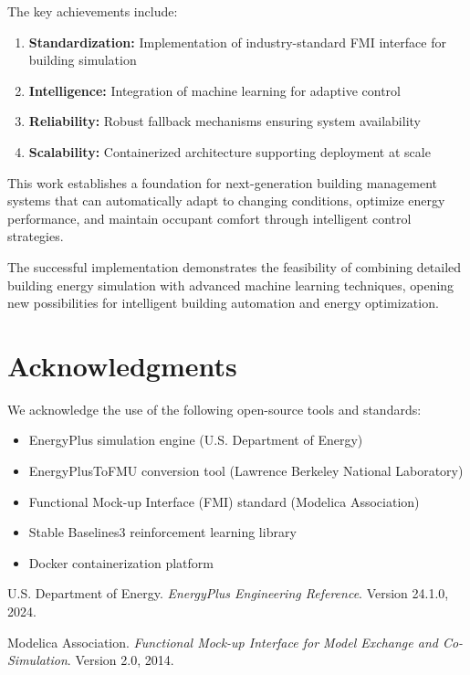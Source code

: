 \documentclass[12pt,a4paper]{article}
\begin{document}
{{The key achievements include:

\begin{enumerate}
    \item \textbf{Standardization:} Implementation of industry-standard FMI interface for building simulation
    \item \textbf{Intelligence:} Integration of machine learning for adaptive control
    \item \textbf{Reliability:} Robust fallback mechanisms ensuring system availability
    \item \textbf{Scalability:} Containerized architecture supporting deployment at scale
\end{enumerate}

This work establishes a foundation for next-generation building management systems that can automatically adapt to changing conditions, optimize energy performance, and maintain occupant comfort through intelligent control strategies.

The successful implementation demonstrates the feasibility of combining detailed building energy simulation with advanced machine learning techniques, opening new possibilities for intelligent building automation and energy optimization.

\section*{Acknowledgments}

We acknowledge the use of the following open-source tools and standards:
\begin{itemize}
    \item EnergyPlus simulation engine (U.S. Department of Energy)
    \item EnergyPlusToFMU conversion tool (Lawrence Berkeley National Laboratory)
    \item Functional Mock-up Interface (FMI) standard (Modelica Association)
    \item Stable Baselines3 reinforcement learning library
    \item Docker containerization platform
\end{itemize}


\begin{thebibliography}{9}

U.S. Department of Energy.
\textit{EnergyPlus Engineering Reference}.
Version 24.1.0, 2024.

Modelica Association.
\textit{Functional Mock-up Interface for Model Exchange and Co-Simulation}.
Version 2.0, 2014.


\end{thebibliography}}}
\end{document}
